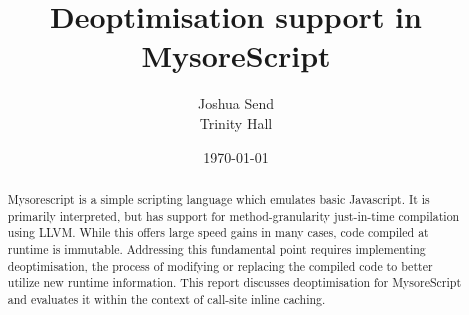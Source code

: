 \documentclass[journal,comsoc]{IEEEtran}
\begin{document}
%
\title{Deoptimisation support in MysoreScript}
%
%
%

\author{Joshua Send \\ Trinity Hall}%
\date{\today}

\maketitle

\begin{abstract}
Mysorescript is a simple scripting language which emulates basic Javascript. It is primarily interpreted, but has support for method-granularity just-in-time compilation using LLVM. While this offers large speed gains in many cases, code compiled at runtime is immutable. Addressing this fundamental point requires implementing deoptimisation, the process of modifying or replacing the compiled code to better utilize new runtime information. This report discusses deoptimisation for MysoreScript and evaluates it within the context of call-site inline caching.
\end{abstract}





%
\IEEEpeerreviewmaketitle
\end{document}
